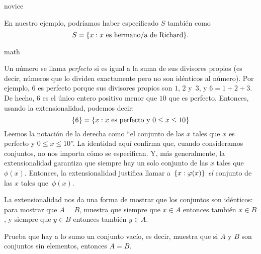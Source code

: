 \documentclass[../../../include/open-logic-section]{subfiles}
\begin{document}
\begin{tagblock}{novice}
\begin{ex}
En nuestro ejemplo, podríamos haber especificado $S$ también como
\[
S = \{ x : x \text{ es hermano/a de Richard} \}.
\]
\end{ex}
\end{tagblock}

\begin{tagblock}{math}
\begin{ex}
Un número se llama \emph{perfecto} si es igual a la suma de sus divisores propios (es decir, números que lo dividen exactamente pero no son idénticos al número). Por ejemplo, $6$ es perfecto porque sus divisores propios son $1$, $2$ y~$3$, y $6 = 1 + 2 + 3$. De hecho, $6$ es el único entero positivo menor que $10$ que es perfecto. Entonces, usando la extensionalidad, podemos decir:
\[
	\{6\} = \{ x : x\text{ es perfecto y }0 \leq x \leq 10 \}
\]
Leemos la notación de la derecha como ``el conjunto de las $x$ tales que $x$ es perfecto y $0 \leq x \leq 10$''. La identidad aquí confirma que, cuando consideramos conjuntos, no nos importa cómo se especifican. Y, más generalmente, la extensionalidad garantiza que siempre hay un solo conjunto de las $x$ tales que $\phi(x)$.
Entonces, la extensionalidad justifica llamar a $\{ x : \varphi(x) \}$ \emph{el} conjunto de las $x$ tales que~$\phi(x)$.
\end{ex}
\end{tagblock}

La extensionalidad nos da una forma de mostrar que los conjuntos son idénticos: para mostrar que $A = B$, muestra que siempre que $x \in A$ entonces también $x \in B$, y siempre que $y \in B$ entonces también $y \in A$.

\begin{prob}
Prueba que hay a lo sumo un conjunto vacío, es decir, muestra que si $A$ y $B$ son conjuntos sin elementos, entonces $A = B$.
\end{prob}
\end{document}
